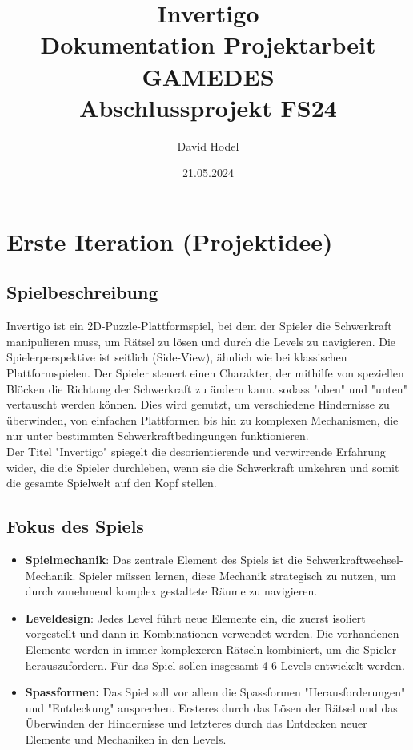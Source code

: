 \documentclass{article}
\title{%
Invertigo \\
\large Dokumentation Projektarbeit GAMEDES \\
  Abschlussprojekt FS24}
\author{David Hodel}
\date{21.05.2024}
\begin{document}
\maketitle
\newpage

\tableofcontents
\newpage

\section{Erste Iteration (Projektidee)}

\subsection{Spielbeschreibung}
Invertigo ist ein 2D-Puzzle-Plattformspiel, bei dem der Spieler die Schwerkraft manipulieren muss,
um Rätsel zu lösen und durch die Levels zu navigieren.
Die Spielerperspektive ist seitlich (Side-View), ähnlich wie bei klassischen Plattformspielen.
Der Spieler steuert einen Charakter, der mithilfe von speziellen Blöcken die Richtung der Schwerkraft zu ändern kann.
sodass "oben" und "unten" vertauscht werden können.
Dies wird genutzt, um verschiedene Hindernisse zu überwinden, von einfachen Plattformen bis hin zu komplexen Mechanismen,
die nur unter bestimmten Schwerkraftbedingungen funktionieren.
\\
Der Titel "Invertigo" spiegelt die desorientierende und verwirrende Erfahrung wider, die die Spieler durchleben,
wenn sie die Schwerkraft umkehren und somit die gesamte Spielwelt auf den Kopf stellen.

\subsection{Fokus des Spiels}

\begin{itemize}
    \item \textbf{Spielmechanik}: Das zentrale Element des Spiels ist die Schwerkraftwechsel-Mechanik.
    Spieler müssen lernen, diese Mechanik strategisch zu nutzen, um durch zunehmend komplex gestaltete Räume zu navigieren.
    \item \textbf{Leveldesign}: Jedes Level führt neue Elemente ein, die zuerst isoliert vorgestellt und dann in Kombinationen verwendet werden.
    Die vorhandenen Elemente werden in immer komplexeren Rätseln kombiniert, um die Spieler herauszufordern.
    Für das Spiel sollen insgesamt 4-6 Levels entwickelt werden.
    \item \textbf{Spassformen:} Das Spiel soll vor allem die Spassformen "Herausforderungen" und "Entdeckung" ansprechen. Ersteres durch das Lösen
    der Rätsel und das Überwinden der Hindernisse und letzteres durch das Entdecken neuer Elemente und Mechaniken in den Levels.
\end{itemize}
\end{document}
